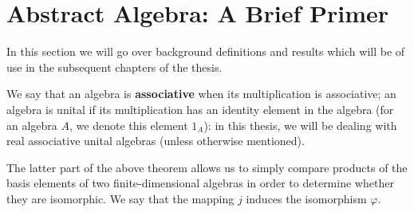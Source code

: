 \section{Abstract Algebra: A Brief Primer}\label{s:algebra}
In this section we will go over background definitions and results which will be of use in the subsequent chapters of the thesis.

%
%
%
%
%
%
%
%
%
%



We say that an algebra is \textbf{associative} when its multiplication is associative; an algebra is unital if its multiplication has an identity element in the algebra (for an algebra $A$, we denote this element $1_A$): in this thesis, we will be dealing with real associative unital algebras (unless otherwise mentioned).








	
The latter part of the above theorem allows us to simply compare products of the basis elements of two finite-dimensional algebras in order to determine whether they are isomorphic. We say that the mapping $j$ induces the isomorphism $\varphi$.

%





